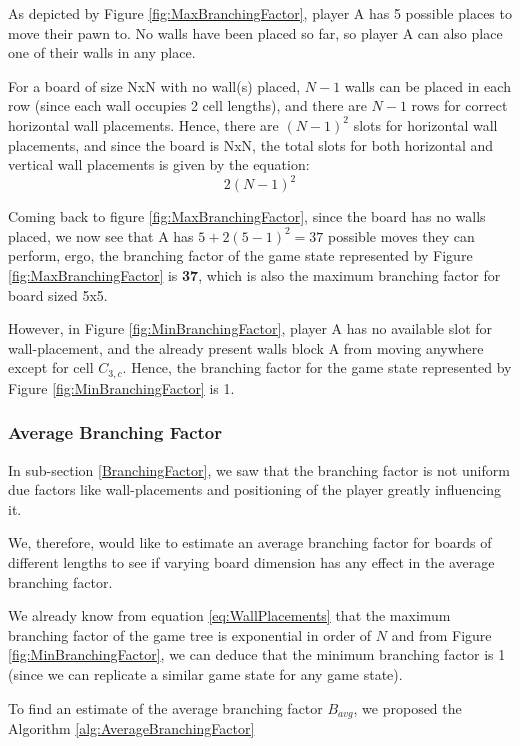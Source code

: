 As depicted by Figure \ref{fig:MaxBranchingFactor}, player A has 5 possible places to move their pawn to. No walls have been placed so far, so player A can also place one of their walls in any place.

For a board of size NxN with no wall(s) placed, $N-1$ walls can be placed in each row (since each wall occupies 2 cell lengths), and there are $N-1$ rows for correct horizontal wall placements. Hence, there are $(N-1)^2$ slots for horizontal wall placements, and since the board is NxN, the total  slots for both horizontal and vertical wall placements is given by the equation:
\begin{equation}
\label{eq:WallPlacements}
    2(N-1)^2
\end{equation}

Coming back to figure \ref{fig:MaxBranchingFactor}, since the board has no walls placed, we now see that A has $5 + 2(5-1)^2 = 37$ possible moves they can perform, ergo, the branching factor of the game state represented by Figure \ref{fig:MaxBranchingFactor} is \textbf{37}, which is also the maximum branching factor for board sized 5x5.

However, in Figure \ref{fig:MinBranchingFactor}, player A has no available slot for wall-placement, and the already present walls block A from moving anywhere except for cell \textbf{$C_{3, c}$}. Hence, the branching factor for the game state represented by Figure \ref{fig:MinBranchingFactor} is 1.

\subsubsection{Average Branching Factor}

In sub-section \ref{BranchingFactor}, we saw that the branching factor is not uniform due factors like wall-placements and positioning of the player greatly influencing it.

We, therefore, would like to estimate an average branching factor for boards of different lengths to see if varying board dimension has any effect in the average branching factor.

We already know from equation \ref{eq:WallPlacements} that the maximum branching factor of the game tree is exponential in order of $N$ and from Figure \ref{fig:MinBranchingFactor}, we can deduce that the minimum branching factor is 1 (since we can replicate a similar game state for any game state).

To find an estimate of the average branching factor $B_{avg}$, we proposed the Algorithm \ref{alg:AverageBranchingFactor}

